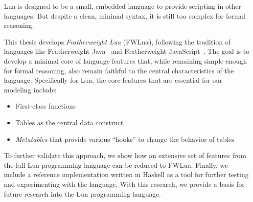 Lua is designed to be a small, embedded language to provide scripting in other languages.  But despite a clean, minimal syntax, it is still too complex for formal reasoning.

This thesis develops \emph{Featherweight Lua} (FWLua), following the tradition of languages like Featherweight Java~\cite{aaa} and Featherweight JavaScript~\cite{aaa}.  The goal is to develop a minimal core of language features that, while remaining simple enough for formal reasoning, also remain faithful to the central characteristics of the language.  Specifically for Lua, the core features that are essential for our modeling include:
\begin{itemize}
\item
First-class functions
\item
Tables as the central data construct
\item
\emph{Metatables} that provide various ``hooks'' to change the behavior of tables
\end{itemize}

To further validate this approach, we show how an extensive set of features
from the full Lua programming language can be reduced to FWLua.
Finally, we include a reference implementation written in Haskell
as a tool for further testing and experimenting with the language.
With this research, we provide a basis for future research into the Lua programming language.


